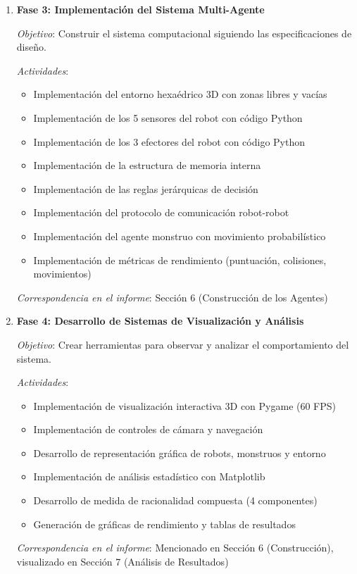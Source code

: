 \documentclass[10pt,twocolumn]{article}
\begin{document}
\begin{enumerate}
\item \textbf{Fase 3: Implementación del Sistema Multi-Agente}

\textit{Objetivo}: Construir el sistema computacional siguiendo las especificaciones de diseño.

\textit{Actividades}:
\begin{itemize}
\item Implementación del entorno hexaédrico 3D con zonas libres y vacías
\item Implementación de los 5 sensores del robot con código Python
\item Implementación de los 3 efectores del robot con código Python
\item Implementación de la estructura de memoria interna
\item Implementación de las reglas jerárquicas de decisión
\item Implementación del protocolo de comunicación robot-robot
\item Implementación del agente monstruo con movimiento probabilístico
\item Implementación de métricas de rendimiento (puntuación, colisiones, movimientos)
\end{itemize}

\textit{Correspondencia en el informe}: Sección 6 (Construcción de los Agentes)

\item \textbf{Fase 4: Desarrollo de Sistemas de Visualización y Análisis}

\textit{Objetivo}: Crear herramientas para observar y analizar el comportamiento del sistema.

\textit{Actividades}:
\begin{itemize}
\item Implementación de visualización interactiva 3D con Pygame (60 FPS)
\item Implementación de controles de cámara y navegación
\item Desarrollo de representación gráfica de robots, monstruos y entorno
\item Implementación de análisis estadístico con Matplotlib
\item Desarrollo de medida de racionalidad compuesta (4 componentes)
\item Generación de gráficas de rendimiento y tablas de resultados
\end{itemize}

\textit{Correspondencia en el informe}: Mencionado en Sección 6 (Construcción), visualizado en Sección 7 (Análisis de Resultados)


\end{enumerate}
\end{document}
